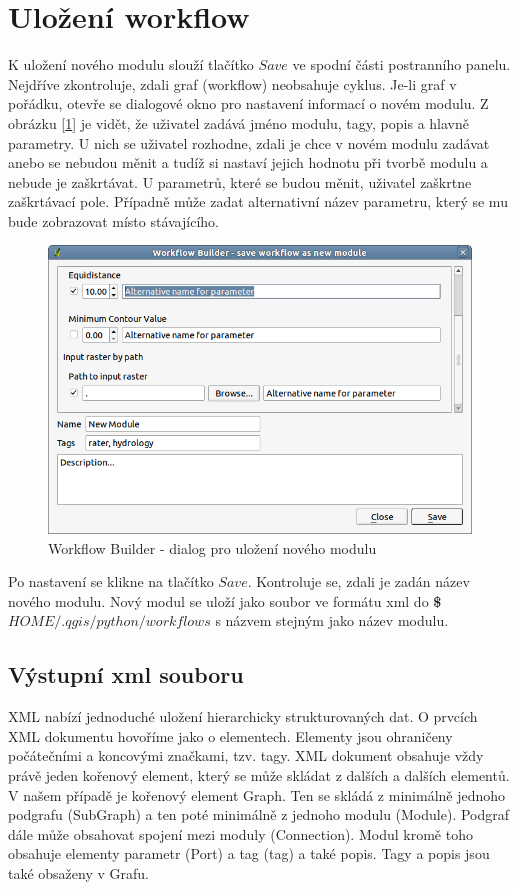 \newpage
\section{Uložení workflow}
\nocite{demel:book}

K uložení nového modulu slouží tlačítko $Save$ ve spodní části
postranního panelu. Nejdříve zkontroluje, zdali graf (workflow)
neobsahuje cyklus. Je-li graf v pořádku, otevře se dialogové okno pro
nastavení informací o novém modulu. Z obrázku
[\figurename \ref{wf:saveDialog}] je vidět, že uživatel zadává jméno
modulu, tagy, popis a hlavně parametry. U nich se uživatel rozhodne,
zdali je chce v novém modulu zadávat anebo se nebudou měnit a tudíž si
nastaví jejich hodnotu při tvorbě modulu a nebude je zaškrtávat. U
parametrů, které se budou měnit, uživatel zaškrtne zaškrtávací
pole. Případně může zadat alternativní název parametru, který se mu
bude zobrazovat místo stávajícího.

\begin{figure}[h]
	\centering
	\includegraphics[scale=0.6]{pictures/wf/wf_saveDialog}
	\caption{Workflow Builder - dialog pro uložení nového modulu}
  	\label{wf:saveDialog}
\end{figure}

Po nastavení se klikne na tlačítko $Save$. Kontroluje se, zdali je
zadán název nového modulu. Nový modul se uloží jako soubor ve formátu
xml do \textbf{\$$HOME/.qgis/python/workflows$} s názvem stejným jako
název modulu.

\subsection{Výstupní xml souboru}
XML nabízí jednoduché uložení hierarchicky strukturovaných dat. O
prvcích XML dokumentu hovoříme jako o elementech. Elementy jsou
ohraničeny počátečními a koncovými značkami, tzv. tagy. XML dokument
obsahuje vždy právě jeden kořenový element, který se může skládat z
dalších a dalších elementů. V našem případě je kořenový element
Graph. Ten se skládá z minimálně jednoho podgrafu (SubGraph) a ten
poté minimálně z jednoho modulu (Module). Podgraf dále může obsahovat
spojení mezi moduly (Connection). Modul kromě toho obsahuje elementy
parametr (Port) a tag (tag) a také popis.  Tagy a popis jsou také
obsaženy v Grafu. \\

